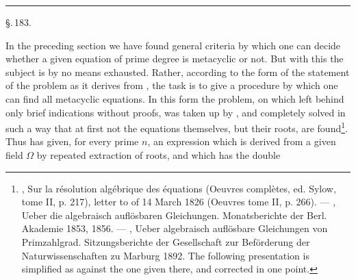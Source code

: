 \begin{center}


\rule{0.3\linewidth}{0.4pt}

\S.\,183.

\end{center}

In the preceding section we have found general criteria by which one can decide whether a given equation of prime degree is metacyclic or not. But with this the subject is by no means exhausted. Rather, according to the form of the statement of the problem as it derives from , the task is to give a procedure by which one can find all metacyclic equations. In this form the problem, on which  left behind only brief indications without proofs, was taken up by , and completely solved in such a way that at first not the equations themselves, but their roots, are found\footnote{, Sur la résolution algébrique des équations (Oeuvres complètes, ed. Sylow, tome II, p. 217), letter to  of 14 March 1826 (Oeuvres tome II, p. 266). --- , Ueber die algebraisch auflösbaren Gleichungen. Monatsberichte der Berl. Akademie 1853, 1856. --- , Ueber algebraisch auflösbare Gleichungen von Primzahlgrad. Sitzungsberichte der Gesellschaft zur Beförderung der Naturwissenschaften zu Marburg 1892. The following presentation is simplified as against the one given there, and corrected in one point.}. Thus  has given, for every prime $n$, an expression which is derived from a given field $\Omega$ by repeated extraction of roots, and which has the double
